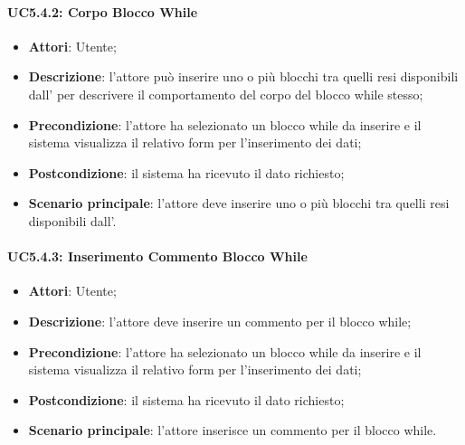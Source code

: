 \paragraph{UC5.4.2: Corpo Blocco While}
\label{UC5.4.2}
\begin{itemize}
	\item \textbf{Attori}: Utente;
	\item \textbf{Descrizione}: l'attore può inserire uno o più blocchi tra quelli resi disponibili dall' per descrivere il comportamento del corpo del blocco while stesso;
	\item \textbf{Precondizione}: l'attore ha selezionato un blocco while da inserire e il sistema visualizza il relativo form per l'inserimento dei dati;
	\item \textbf{Postcondizione}: il sistema ha ricevuto il dato richiesto;
	\item \textbf{Scenario principale}: l'attore deve inserire uno o più blocchi tra quelli resi disponibili dall'.
\end{itemize}

\paragraph{UC5.4.3: Inserimento Commento Blocco While}
\label{UC5.4.3}
\begin{itemize}
	\item \textbf{Attori}: Utente;
	\item \textbf{Descrizione}: l'attore deve inserire un commento per il blocco while;
	\item \textbf{Precondizione}: l'attore ha selezionato un blocco while da inserire e il sistema visualizza il relativo form per l'inserimento dei dati;
	\item \textbf{Postcondizione}: il sistema ha ricevuto il dato richiesto;
	\item \textbf{Scenario principale}: l'attore inserisce un commento per il blocco while.
\end{itemize}

